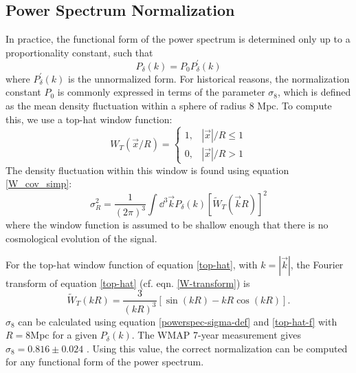 \subsection{Power Spectrum Normalization}
In practice, the functional form of the power spectrum is determined only
up to a proportionality constant, such that
\begin{equation}
  P_\delta(k) = P_0 P^\prime_\delta(k)
\end{equation}
where $P^\prime_\delta(k)$ is the unnormalized form.
For historical reasons, the normalization constant $P_0$ is commonly 
expressed in terms of the parameter $\sigma_8$, 
which is defined as the mean density 
fluctuation within a sphere of radius 8 Mpc.  To compute this, we use a 
top-hat window function:
\begin{equation}
\label{top-hat}
  W_T(\vec{x}/R) = \left\{
    \begin{array}{ll}
      1, & |\vec x|/R \le 1 \\
      0, & |\vec x|/R > 1
    \end{array}
    \right.
\end{equation} 
The density fluctuation within this window is found using equation \ref{W_cov_simp}:
\begin{equation}
  \label{powerspec-sigma-def}
  \sigma_R^2 = \frac{1}{(2\pi)^3}\int \dd^3\vec{k} 
  P_\delta(k) [\widetilde{W}_T(\vec{k}R)]^2
\end{equation}
where the window function is assumed to be shallow enough that there is no
cosmological evolution of the signal.

For the top-hat window function of equation \ref{top-hat}, with 
$k = |\vec{k}|$,
the Fourier transform of equation \ref{top-hat} (cf. eqn. \ref{W-transform}) is
\begin{equation}
  \label{top-hat-f}
  \widetilde{W}_T(kR) = \frac{3}{(kR)^3}\left[\sin(kR) - kR\cos(kR) \right].
\end{equation}
$\sigma_8$ can be calculated using equation \ref{powerspec-sigma-def}
and \ref{top-hat-f} with $R=8$Mpc for a given $P_\delta(k)$. 
The WMAP 7-year measurement gives $\sigma_8 = 0.816 \pm 0.024$ 
\citep{WMAP7}.  Using this value, the correct normalization 
can be computed for any functional form of the power spectrum.

